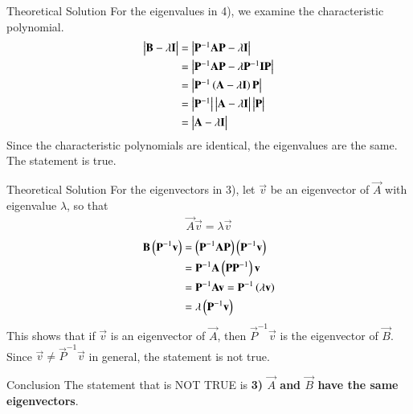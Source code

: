 \documentclass{beamer}
\begin{document}
\begin{frame}{Theoretical Solution}
For the eigenvalues in 4), we examine the characteristic polynomial.
\begin{align}
    \begin{vmatrix}\mathbf{B} - \lambda\mathbf{I}\end{vmatrix} &= \begin{vmatrix}\mathbf{P}^{-1}\mathbf{A}\mathbf{P} - \lambda\mathbf{I}\end{vmatrix} \\
    &= \begin{vmatrix}\mathbf{P}^{-1}\mathbf{A}\mathbf{P} - \lambda\mathbf{P}^{-1}\mathbf{I}\mathbf{P}\end{vmatrix} \\
    &= \begin{vmatrix}\mathbf{P}^{-1}\left(\mathbf{A} - \lambda\mathbf{I}\right)\mathbf{P}\end{vmatrix} \\
    &= \begin{vmatrix}\mathbf{P}^{-1}\end{vmatrix}\begin{vmatrix}\mathbf{A} - \lambda\mathbf{I}\end{vmatrix}\begin{vmatrix}\mathbf{P}\end{vmatrix} \\
    &= \begin{vmatrix}\mathbf{A} - \lambda\mathbf{I}\end{vmatrix}
\end{align}
Since the characteristic polynomials are identical, the eigenvalues are the same. The statement is true.
\end{frame}

\begin{frame}{Theoretical Solution}
For the eigenvectors in 3), let $\vec{v}$ be an eigenvector of $\vec{A}$ with eigenvalue $\lambda$, so that
\begin{align}
    \vec{A}\vec{v} = \lambda\vec{v}
\end{align}
\begin{align}
    \mathbf{B}\left(\mathbf{P}^{-1}\mathbf{v}\right) &= \left(\mathbf{P}^{-1}\mathbf{A}\mathbf{P}\right)\left(\mathbf{P}^{-1}\mathbf{v}\right) \\
    &= \mathbf{P}^{-1}\mathbf{A}\left(\mathbf{P}\mathbf{P}^{-1}\right)\mathbf{v} \\
    &= \mathbf{P}^{-1}\mathbf{A}\mathbf{v} = \mathbf{P}^{-1}\left(\lambda\mathbf{v}\right) \\
    &= \lambda\left(\mathbf{P}^{-1}\mathbf{v}\right)
\end{align}
This shows that if $\vec{v}$ is an eigenvector of $\vec{A}$, then $\vec{P}^{-1}\vec{v}$ is the eigenvector of $\vec{B}$. Since $\vec{v} \neq \vec{P}^{-1}\vec{v}$ in general, the statement is not true.
\end{frame}

\begin{frame}{Conclusion}
The statement that is NOT TRUE is \textbf{3) $\vec{A}$ and $\vec{B}$ have the same eigenvectors}.
\end{frame}
\end{document}
